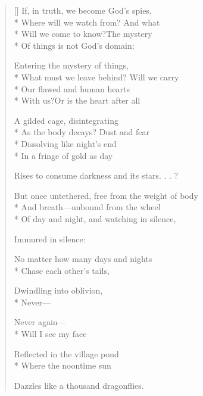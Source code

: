\label{ch:lear_bl}
\settowidth{\versewidth}{But once untethered, free from the weight of body}
\begin{verse}[\versewidth]
If, in truth, we become God's spies,\\*
Where will we watch from?   And what\\*
Will we come to know?\qquad The mystery\\*
Of things is not God's domain;

Entering the mystery of things,\\*
What must we leave behind?  Will we carry\\*
Our flawed and human hearts\\*
With us?\qquad Or is the heart after all

A gilded cage, disintegrating\\*
As the body decays?   Dust and fear\\*
Dissolving like night's end\\*
In a fringe of gold as day

Rises to consume darkness and its stars. . . ?

But once untethered, free from the weight of body\\*
And breath---unbound from the wheel\\*
Of day and night, and watching in silence,

Immured in silence:

No matter how many days and nights\\*
Chase each other's tails,

Dwindling into oblivion,\\*
Never---

Never again---\\*
Will I see my face

Reflected in the village pond\\*
Where the noontime sun

Dazzles like a thousand dragonflies.
\end{verse}
